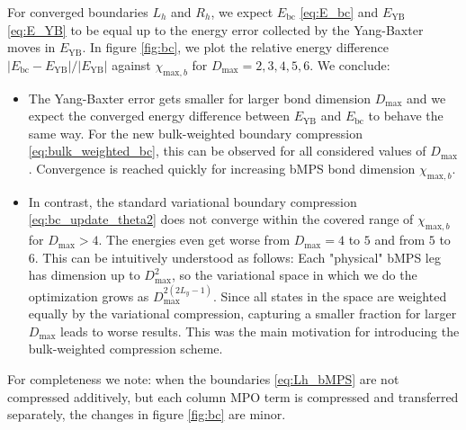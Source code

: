 \noindent For converged boundaries $L_h$ and $R_h$, we expect $E_{\text{bc}}$ \eqref{eq:E_bc} and $E_{\text{YB}}$ \eqref{eq:E_YB} to be equal up to the energy error collected by the Yang-Baxter moves in $E_{\text{YB}}$. In figure \ref{fig:bc}, we plot the relative energy difference $\vert E_{\text{bc}} - E_{\text{YB}} \vert / \vert E_{\text{YB}} \vert$ against $\chi_{\text{max}, b}$ for $D_{\text{max}} = 2, 3, 4, 5, 6$. We conclude:
\begin{itemize}
	\item The Yang-Baxter error gets smaller for larger bond dimension $D_{\text{max}}$ and we expect the converged energy difference between $E_{\text{YB}}$ and $E_{\text{bc}}$ to behave the same way. For the new bulk-weighted boundary compression \eqref{eq:bulk_weighted_bc}, this can be observed for all considered values of $D_{\text{max}}$. Convergence is reached quickly for increasing bMPS bond dimension $\chi_{\text{max}, b}$.
	\item In contrast, the standard variational boundary compression \eqref{eq:bc_update_theta2} does not converge within the covered range of $\chi_{\text{max}, b}$ for $D_{\text{max}} > 4$. The energies even get worse from $D_{\text{max}} = 4$ to $5$ and from $5$ to $6$. This can be intuitively understood as follows: Each "physical" bMPS leg has dimension up to $D_{\text{max}}^2$, so the variational space in which we do the optimization grows as $D_{\text{max}}^{2(2L_y-1)}$. Since all states in the space are weighted equally by the variational compression, capturing a smaller fraction for larger $D_{\text{max}}$ leads to worse results. This was the main motivation for introducing the bulk-weighted compression scheme. 
\end{itemize}
For completeness we note: when the boundaries \eqref{eq:Lh_bMPS} are not compressed additively, but each column MPO term is compressed and transferred separately, the changes in figure \ref{fig:bc} are minor.


